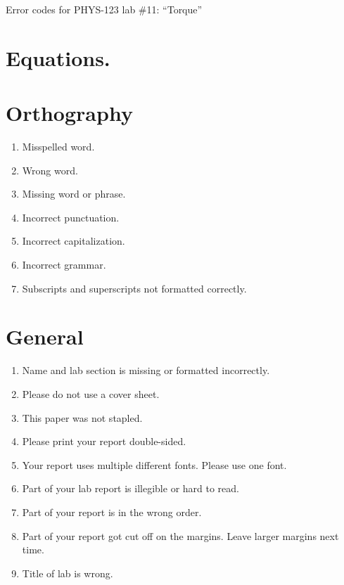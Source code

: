 \documentclass[12pt,letterpaper]{article}
\begin{document}
\begin{center}
  Error codes for PHYS-123 lab \#11: ``Torque''
\end{center}

\section*{Equations.}

\begin{multicols}{2}

\section{Orthography}

\begin{enumerate}[start=10]
  \item Misspelled word.
  \item Wrong word.
  \item Missing word or phrase.
  \item Incorrect punctuation.
  \item Incorrect capitalization.
  \item Incorrect grammar.
  \item Subscripts and superscripts not formatted correctly.
\end{enumerate}

\section{General}

\begin{enumerate}[start=20]
  \item Name and lab section is missing or formatted incorrectly.
  \item Please do not use a cover sheet.
  \item This paper was not stapled.
  \item Please print your report double-sided.
  \item Your report uses multiple different fonts. Please use one font.
  \item Part of your lab report is illegible or hard to read.
  \item Part of your report is in the wrong order.
  \item Part of your report got cut off on the margins.
    Leave larger margins next time.
  \item Title of lab is wrong.
\end{enumerate}


\end{multicols}
\end{document}
